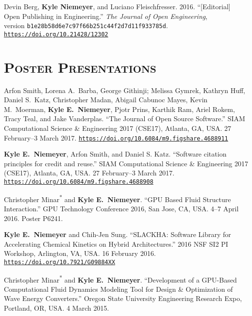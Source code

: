 \documentclass[margin,line,11pt]{res}
\makeatletter
\newlength{\bibhang}
\newlength{\bibsep}
 {\@listi \global\bibsep\itemsep \global\advance\bibsep by\parsep}
\newenvironment{bibenum*}
  {\renewcommand\labelenumi{\theenumi.}%
   \etaremune[
     topsep=0pt,
     itemsep=\bibsep,
     parsep=0pt,partopsep=0pt,
     itemindent=-\bibhang,
     leftmargin={\bibhang+\widthof{[999]}}]}
  {\endetaremune}
\newcommand*{\doi}[1]{\href{https://doi.org/#1}{\nolinkurl{https://doi.org/#1}}}
\makeatother
\begin{document}
\begin{resume}
\begin{bibenum*}
\item Devin Berg, \textbf{Kyle Niemeyer}, and Luciano Fleischfresser.
2016.
``[Editorial] Open Publishing in Engineering.''
\textit{The Journal of Open Engineering}, \\
version \texttt{b1e28b58d6e7c97f66b251c44f2d7d11f933785d}.
\doi{10.21428/12302}

\end{bibenum*}

\section{\textsc{Poster Presentations}}

\begin{bibenum*}

\item Arfon Smith, Lorena A.\ Barba, George Githinji; Melissa Gymrek, Kathryn Huff, Daniel S.\ Katz,
Christopher Madan, Abigail Cabunoc Mayes, Kevin M.\ Moerman, \textbf{Kyle E.~Niemeyer}, Pjotr Prins,
Karthik Ram, Ariel Rokem, Tracy Teal, and Jake Vanderplas.
``The Journal of Open Source Software.''
SIAM Computational Science \& Engineering 2017 (CSE17), Atlanta, GA, USA.
27 February--3 March 2017.
\doi{10.6084/m9.figshare.4688911}

\item \textbf{Kyle E.~Niemeyer}, Arfon Smith, and Daniel S. Katz.
``Software citation principles for credit and reuse.''
SIAM Computational Science \& Engineering 2017 (CSE17), Atlanta, GA, USA.
27 February--3 March 2017.
\doi{10.6084/m9.figshare.4688908}

\item Christopher Minar\textsuperscript{*} and \textbf{Kyle E.~Niemeyer}.
``GPU Based Fluid Structure Interaction.''
GPU Technology Conference 2016, San Jose, CA, USA.
4--7 April 2016.
Poster P6241.

\item \textbf{Kyle E.~Niemeyer} and Chih-Jen Sung.
``SLACKHA: Software Library for Accelerating Chemical Kinetics on Hybrid Architectures.'' 2016 NSF SI2 PI Workshop, Arlington, VA, USA.
16 February 2016.
\doi{10.7921/G09884XX}

\item Christopher Minar\textsuperscript{*} and \textbf{Kyle E.~Niemeyer}.
``Development of a GPU-Based Computational Fluid Dynamics Modeling Tool for Design \& Optimization of Wave Energy Converters.''
Oregon State University Engineering Research Expo, Portland, OR, USA.
4 March 2015.


\end{bibenum*}
\end{resume}
\end{document}
